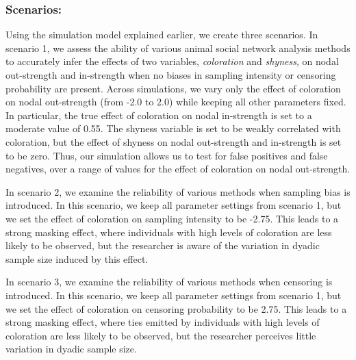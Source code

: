 \documentclass[Afour,sageh,times]{sagej}
\begin{document}
\subsubsection{Scenarios:} 
Using the simulation model explained earlier, we create three scenarios. In scenario 1, we assess the ability of various animal social network analysis methods to accurately infer the effects of two variables, \emph{coloration} and \emph{shyness}, on nodal out-strength and in-strength when no biases in sampling intensity or censoring probability are present. Across simulations, we vary only the effect of coloration on nodal out-strength (from -2.0 to 2.0) while keeping all other parameters fixed. In particular, the true effect of coloration on nodal in-strength is set to a moderate value of 0.55. The shyness variable is set to be weakly correlated with coloration, but the effect of shyness on nodal out-strength and in-strength is set to be zero. Thus, our simulation allows us to test for false positives and false negatives, over a range of values for the effect of coloration on nodal out-strength.

In scenario 2, we examine the reliability of various methods when sampling bias is introduced. In this scenario, we keep all parameter settings from scenario 1, but we set the effect of coloration on sampling intensity to be -2.75. This leads to a strong masking effect, where individuals with high levels of coloration are less likely to be observed, but the researcher is aware of the variation in dyadic sample size induced by this effect.

In scenario 3, we examine the reliability of various methods when censoring is introduced. In this scenario, we keep all parameter settings from scenario 1, but we set the effect of coloration on censoring probability to be 2.75. This leads to a strong masking effect, where ties emitted by individuals with high levels of coloration are less likely to be observed, but the researcher perceives little variation in dyadic sample size.
\end{document}
